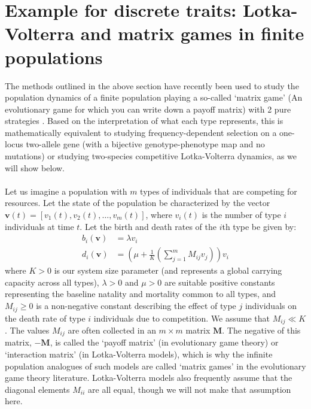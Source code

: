 
\section{Example for discrete traits: Lotka-Volterra and matrix games in finite populations}

The methods outlined in the above section have recently been used to study the population dynamics of a finite population playing a so-called `matrix game' (An evolutionary game for which you can write down a payoff matrix) with 2 pure strategies \citep{tao_stochastic_2007}. Based on the interpretation of what each type represents, this is mathematically equivalent to studying frequency-dependent selection on a one-locus two-allele gene (with a bijective genotype-phenotype map and no mutations) or studying two-species competitive Lotka-Volterra dynamics, as we will show below.\\
\\
Let us imagine a population with $m$ types of individuals that are competing for resources. Let the state of the population be characterized by the vector $\mathbf{v}(t) = [v_1(t),v_2(t),\ldots,v_m(t)]$, where $v_i(t)$ is the number of type $i$ individuals at time $t$. Let the birth and death rates of the $i$th type be given by:
\begin{equation}
\label{nD_example_numbers_b_d_rates}
\begin{aligned}
b_i(\mathbf{v}) &= \lambda v_i\\
d_i(\mathbf{v}) &= \left(\mu + \frac{1}{K}\left(\sum\limits_{j=1}^{m}M_{ij}v_j\right)\right)v_i
\end{aligned}
\end{equation}
where $K > 0$ is our system size parameter (and represents a global carrying capacity across all types), $\lambda > 0$ and $\mu > 0$ are suitable positive constants representing the baseline natality and mortality common to all types, and $M_{ij} \geq 0$ is a non-negative constant describing the effect of type $j$ individuals on the death rate of type $i$ individuals due to competition. We assume that $M_{ij} \ll K$. The values $M_{ij}$ are often collected in an $m \times m$ matrix $\mathbf{M}$. The negative of this matrix, $-\mathbf{M}$, is called the `payoff matrix' (in evolutionary game theory) or `interaction matrix' (in Lotka-Volterra models), which is why the infinite population analogues of such models are called `matrix games' in the evolutionary game theory literature. Lotka-Volterra models also frequently assume that the diagonal elements $M_{ii}$ are all equal, though we will not make that assumption here.\\
